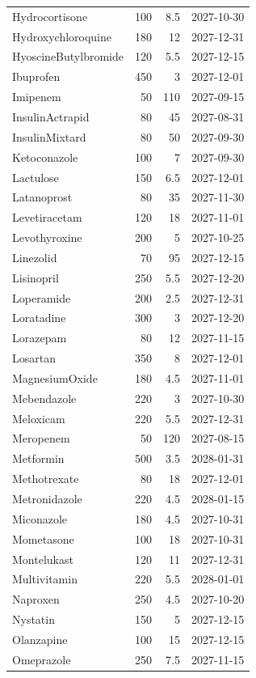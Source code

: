 \documentclass[12pt]{article}
\begin{document}
\begin{longtable}{lrrl}
Hydrocortisone & 100 & 8.5 & 2027-10-30 \\
Hydroxychloroquine & 180 & 12 & 2027-12-31 \\
HyoscineButylbromide & 120 & 5.5 & 2027-12-15 \\
Ibuprofen & 450 & 3 & 2027-12-01 \\
Imipenem & 50 & 110 & 2027-09-15 \\
InsulinActrapid & 80 & 45 & 2027-08-31 \\
InsulinMixtard & 80 & 50 & 2027-09-30 \\
Ketoconazole & 100 & 7 & 2027-09-30 \\
Lactulose & 150 & 6.5 & 2027-12-01 \\
Latanoprost & 80 & 35 & 2027-11-30 \\
Levetiracetam & 120 & 18 & 2027-11-01 \\
Levothyroxine & 200 & 5 & 2027-10-25 \\
Linezolid & 70 & 95 & 2027-12-15 \\
Lisinopril & 250 & 5.5 & 2027-12-20 \\
Loperamide & 200 & 2.5 & 2027-12-31 \\
Loratadine & 300 & 3 & 2027-12-20 \\
Lorazepam & 80 & 12 & 2027-11-15 \\
Losartan & 350 & 8 & 2027-12-01 \\
MagnesiumOxide & 180 & 4.5 & 2027-11-01 \\
Mebendazole & 220 & 3 & 2027-10-30 \\
Meloxicam & 220 & 5.5 & 2027-12-31 \\
Meropenem & 50 & 120 & 2027-08-15 \\
Metformin & 500 & 3.5 & 2028-01-31 \\
Methotrexate & 80 & 18 & 2027-12-01 \\
Metronidazole & 220 & 4.5 & 2028-01-15 \\
Miconazole & 180 & 4.5 & 2027-10-31 \\
Mometasone & 100 & 18 & 2027-10-31 \\
Montelukast & 120 & 11 & 2027-12-31 \\
Multivitamin & 220 & 5.5 & 2028-01-01 \\
Naproxen & 250 & 4.5 & 2027-10-20 \\
Nystatin & 150 & 5 & 2027-12-15 \\
Olanzapine & 100 & 15 & 2027-12-15 \\
Omeprazole & 250 & 7.5 & 2027-11-15 \\

\end{longtable}
\end{document}
